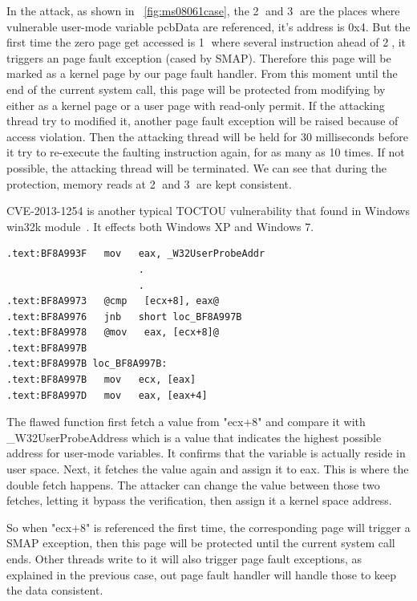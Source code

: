 In the attack, as shown in ~\autoref{fig:ms08061case}, the \textcircled{2} and \textcircled{3} are the places where vulnerable user-mode variable pcbData are referenced, it's address is 0x4. But the first time the zero page get accessed is \textcircled{1} where several instruction ahead of \textcircled{2}, it triggers an page fault exception (cased by SMAP). Therefore this page will be marked as a kernel page by our page fault handler. From this moment until the end of the current system call, this page will be protected from modifying by either as a kernel page or a user page with read-only permit. If the attacking thread try to modified it, another page fault exception  will be raised because of access violation. Then the attacking thread will be held for 30 milliseconds before it try to re-execute the faulting instruction again, for as many as 10 times. If not possible, the attacking thread will be terminated. We can see that during the protection, memory reads at \textcircled{2} and \textcircled{3} are kept consistent.


CVE-2013-1254 is another typical TOCTOU vulnerability that found in Windows win32k module~\cite{jurczyk2013identifying}. It effects both Windows XP and Windows 7. 


\begin{lstlisting}[style=code] 
.text:BF8A993F   mov   eax, _W32UserProbeAddr
                       .
                       .
.text:BF8A9973   @cmp   [ecx+8], eax@    
.text:BF8A9976   jnb   short loc_BF8A997B
.text:BF8A9978   @mov   eax, [ecx+8]@    
.text:BF8A997B
.text:BF8A997B loc_BF8A997B:                           
.text:BF8A997B   mov   ecx, [eax]
.text:BF8A997D   mov   eax, [eax+4]
\end{lstlisting}

The flawed function first fetch a value from "ecx+8" and compare it with \_W32UserProbeAddress which is a value that indicates the highest possible address for user-mode variables. It confirms that the variable is actually reside in user space. Next, it fetches the value again and assign it to eax. This is where the double fetch happens. The attacker can change the value between those two fetches, letting it bypass the verification,  then assign it a kernel space address.

So when "ecx+8" is referenced the first time, the corresponding page will trigger a SMAP exception, then this page will be protected until the current system call ends. Other threads write to it will also trigger page fault exceptions, as explained in the previous case, out page fault handler will handle those to keep the data consistent. 


